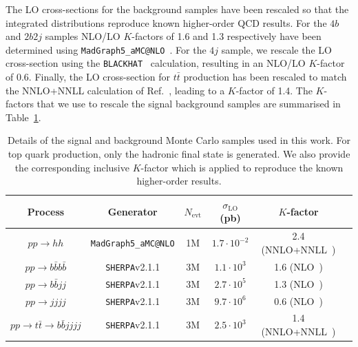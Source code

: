 The LO cross-sections for
the background samples have been rescaled so that the integrated
distributions reproduce known higher-order QCD results.
%
For the $4b$ and $2b2j$ samples NLO/LO $K$-factors of 1.6 and 1.3
respectively have been determined
using {\tt MadGraph5\_aMC@NLO}~\cite{Alwall:2014hca}.
%
For the $4j$ sample, we rescale the LO cross-section
using the {\tt BLACKHAT}~\cite{Bern:2011ep}
calculation, resulting in
an NLO/LO $K$-factor of 0.6.
%
Finally, the LO cross-section for $t\bar{t}$ production has been rescaled
to match the NNLO+NNLL calculation of Ref.~\cite{Czakon:2013goa}, leading
to a $K$-factor of 1.4.
%
The $K$-factors that we use to rescale
the signal background samples are summarised in
Table~\ref{tab:samples}.


\begin{table}[h]
  \small
\begin{center}
\begin{tabular}{|c|c|c|c|c|c|}
\hline
Process &  Generator & $N_{\mathrm{evt}}$ & $\sigma_{\mathrm{LO}}$ (pb)  & $K$-factor \\
\hline
\hline
$pp \to hh$ &  {\tt MadGraph5\_aMC@NLO} & 1M & $1.7\cdot10^{-2}$  &  2.4  (NNLO+NNLL~\cite{deFlorian:2013jea,deFlorian:2015moa}) \\
\hline
\hline
$pp \to b\bar{b}b\bar{b}$ &  {\tt SHERPA}v2.1.1 & 3M &$1.1 \cdot10^3$  & 1.6 (NLO~\cite{Alwall:2014hca}) \\
$pp \to b\bar{b}jj$ &  {\tt SHERPA}v2.1.1 & 3M & $2.7 \cdot 10^5$ & 1.3 (NLO~\cite{Alwall:2014hca}) \\
$pp \to jjjj$ &  {\tt SHERPA}v2.1.1 & 3M  & $9.7\cdot 10^6$ &  0.6 (NLO~\cite{Bern:2011ep})\\
$pp \to t\bar{t}\to b\bar{b}jjjj$ &  {\tt SHERPA}v2.1.1 & 3M & $2.5\cdot 10^3$   & 1.4 (NNLO+NNLL~\cite{Czakon:2013goa})\\
\hline
\end{tabular}
\caption{\small Details of the signal and background Monte
  Carlo samples used in this work.
  For top quark production, only the hadronic final state is generated.
We also provide the corresponding inclusive $K$-factor
  which is applied to reproduce the known
  higher-order results. \label{tab:samples}
} 
\end{center}
\end{table}%


